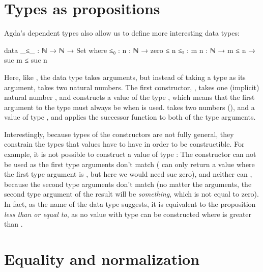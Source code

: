 %

	\section{Types as propositions}

		Agda's dependent types also allow us to define more interesting data
		types:

		\begin{code}
			data _≤_ : ℕ → ℕ → Set where
			  ≤₀  : {n : ℕ} → zero ≤ n
			  ≤ₛ  : {m n : ℕ} → m ≤ n → suc m ≤ suc n
		\end{code}

		Here, like \codett{\_*}, the data type  takes arguments,
		but instead of taking a type as its argument,  takes two
		natural numbers. The first constructor, , takes one
		(implicit) natural number , and constructs a value of the
		type , which means that the first argument to the type
		must always be  when  is used. 
		takes two numbers (), and a value of type ,
		and applies the successor function to both of the type arguments.

		Interestingly, because types of the constructors are not fully general,
		they constrain the types that values have to have in order to be
		constructible. For example, it is not possible to construct a value of
		type : The constructor  can not be
		used as the first type arguments don't match ( can only
		return a value where the first type argument is , but here
		we would need suc zero), and neither can , because the
		second type arguments don't match (no matter the arguments, the second
		type argument of the result will be  \emph{something},
		which is not equal to zero). In fact, as the name of the data type
		suggests, it is equivalent to the proposition \emph{less than or equal
		to}, as no value with type  can be constructed where
		 is greater than .

	\section{Equality and normalization}

